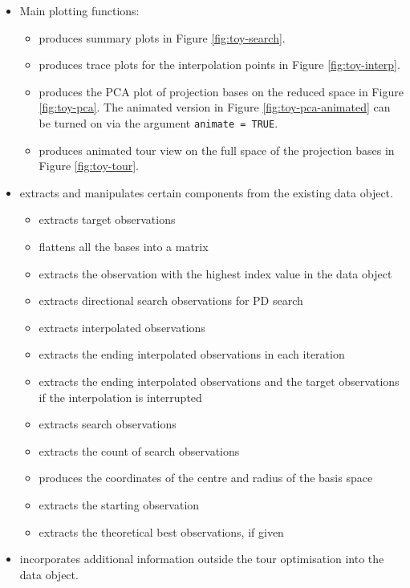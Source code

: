 \begin{itemize}
\item
  Main plotting functions:

  \begin{itemize}
  \tightlist
  \item
     produces summary plots in Figure
    \ref{fig:toy-search}.
  \item
     produces trace plots for the
    interpolation points in Figure \ref{fig:toy-interp}.
  \item
     produces the PCA plot of projection
    bases on the reduced space in Figure \ref{fig:toy-pca}. The animated
    version in Figure \ref{fig:toy-pca-animated} can be turned on via
    the argument \texttt{animate\ =\ TRUE}.
  \item
     produces animated tour view on the
    full space of the projection bases in Figure \ref{fig:toy-tour}.
  \end{itemize}
\item
   extracts and manipulates certain components from the
  existing data object.

  \begin{itemize}
  \tightlist
  \item
     extracts target observations
  \item
     flattens all the bases into a matrix
  \item
     extracts the observation with the highest index
    value in the data object
  \item
     extracts directional search observations
    for PD search
  \item
     extracts interpolated observations
  \item
     extracts the ending interpolated
    observations in each iteration
  \item
     extracts the ending interpolated
    observations and the target observations if the interpolation is
    interrupted
  \item
     extracts search observations
  \item
     extracts the count of search
    observations
  \item
     produces the coordinates of the centre
    and radius of the basis space
  \item
     extracts the starting observation
  \item
     extracts the theoretical best observations, if
    given
  \end{itemize}
\item
   incorporates additional information outside the tour
  optimisation into the data object.


\end{itemize}
